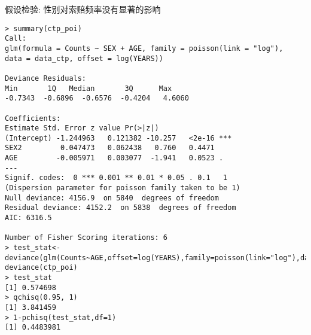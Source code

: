 \documentclass[professionalfont]{beamer}
\begin{document}
\begin{frame}[fragile]{假设检验: 性别对索赔频率没有显著的影响}
\begin{lstlisting}
> summary(ctp_poi)
Call:
glm(formula = Counts ~ SEX + AGE, family = poisson(link = "log"), 
data = data_ctp, offset = log(YEARS))

Deviance Residuals: 
Min       1Q   Median       3Q      Max  
-0.7343  -0.6896  -0.6576  -0.4204   4.6060  

Coefficients:
Estimate Std. Error z value Pr(>|z|)    
(Intercept) -1.244963   0.121382 -10.257   <2e-16 ***
SEX2         0.047473   0.062438   0.760   0.4471    
AGE         -0.005971   0.003077  -1.941   0.0523 .  
---
Signif. codes:  0 *** 0.001 ** 0.01 * 0.05 . 0.1   1
(Dispersion parameter for poisson family taken to be 1)
Null deviance: 4156.9  on 5840  degrees of freedom
Residual deviance: 4152.2  on 5838  degrees of freedom
AIC: 6316.5

Number of Fisher Scoring iterations: 6
> test_stat<-deviance(glm(Counts~AGE,offset=log(YEARS),family=poisson(link="log"),data=data_ctp))-deviance(ctp_poi)
> test_stat
[1] 0.574698
> qchisq(0.95, 1)
[1] 3.841459
> 1-pchisq(test_stat,df=1)
[1] 0.4483981
\end{lstlisting}
\end{frame}
\end{document}
